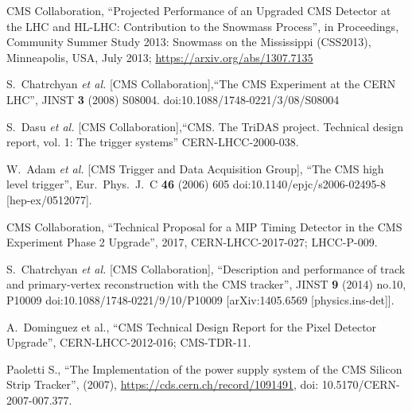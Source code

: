 \begin{thebibliography}{1}
 CMS Collaboration, ``Projected Performance of an Upgraded CMS Detector at the LHC and HL-LHC: Contribution to the Snowmass Process'', in Proceedings, Community Summer Study 2013: Snowmass on the Mississippi (CSS2013), Minneapolis, USA, July 2013; \url{https://arxiv.org/abs/1307.7135}

%
 S.~Chatrchyan {\it et al.} [CMS Collaboration],``The CMS Experiment at the CERN LHC'', JINST {\bf 3} (2008) S08004. doi:10.1088/1748-0221/3/08/S08004

  S.~Dasu {\it et al.} [CMS Collaboration],``CMS. The TriDAS project. Technical design report, vol. 1: The trigger systems'' CERN-LHCC-2000-038.

  W.~Adam {\it et al.} [CMS Trigger and Data Acquisition Group], ``The CMS high level trigger'',  Eur.\ Phys.\ J.\ C {\bf 46} (2006) 605 doi:10.1140/epjc/s2006-02495-8 [hep-ex/0512077].


  CMS Collaboration, ``Technical Proposal for a MIP Timing Detector in the CMS Experiment Phase 2 Upgrade'', 2017, CERN-LHCC-2017-027; LHCC-P-009.


  S.~Chatrchyan {\it et al.} [CMS Collaboration], ``Description and performance of track and primary-vertex reconstruction with the CMS tracker'', JINST {\bf 9} (2014) no.10,  P10009 doi:10.1088/1748-0221/9/10/P10009  [arXiv:1405.6569 [physics.ins-det]].


 A.~Dominguez et al., ``CMS Technical Design Report
  for the Pixel Detector Upgrade'', CERN-LHCC-2012-016; CMS-TDR-11.

 Paoletti S., ``The Implementation of the power supply system of the CMS Silicon Strip Tracker'', (2007), \url{https://cds.cern.ch/record/1091491}, doi: 10.5170/CERN-2007-007.377.


\end{thebibliography}
